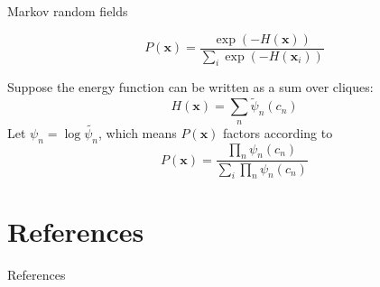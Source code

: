\documentclass[aspectratio=1610]{beamer}					%
\begin{document}
\begin{frame}{Markov random fields}

\begin{equation*}
P(\mathbf{x}) = \frac{\exp\left(-H(\mathbf{x})\right)}{\sum_{i} \exp\left(-H(\mathbf{x}_{i})\right)}
\end{equation*}

Suppose the energy function can be written as a sum over cliques: 
\begin{equation*}
H(\mathbf{x}) = \sum_{n} \tilde{\psi}_{n}(c_{n})
\end{equation*}
Let $\psi_{n} = \log \tilde{\psi_{n}}$, which means $P(\mathbf{x})$ factors according to 
\begin{equation*}
P(\mathbf{x}) = \frac{\prod_{n} \psi_{n}(c_{n})}{\sum_{i} \prod_{n} \psi_{n}(c_{n})}
\end{equation*}


\end{frame}



\section{References}

\begin{frame}[allowframebreaks]{References}
	\tiny
	
\end{frame}
\end{document}
